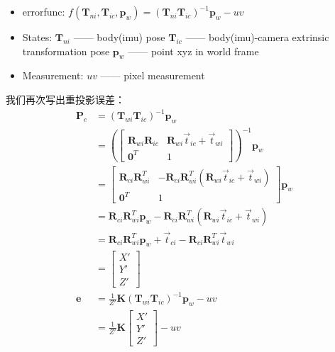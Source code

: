 \documentclass{article}
\begin{document}
\begin{itemize}
	\item errorfunc: $f(\boldsymbol{T}_{ni},\boldsymbol{T}_{ic}, \boldsymbol{p}_{w}) = 
	      (\boldsymbol{T}_{ni}\boldsymbol{T}_{ic})^{-1}\boldsymbol{p}_{w} - uv$
	\item States:   
	      \subitem $\boldsymbol{T}_{ni}$ —— body(imu) pose
	      \subitem $\boldsymbol{T}_{ic}$ —— body(imu)-camera extrinsic transformation pose
	      \subitem $\boldsymbol{p}_{w}$ —— point xyz in world frame
	\item Measurement:  $uv$ —— pixel measurement
\end{itemize}
我们再次写出重投影误差：
\begin{equation}
	\begin{aligned}
		\boldsymbol{P}_c                         & =(\boldsymbol{T}_{wi}\boldsymbol{T}_{ic})^{-1}\boldsymbol{p}_w                                 \\&=
		\left(
		\left[
		\begin{matrix}
		\boldsymbol{R}_{wi}\boldsymbol{R}_{ic}   & \boldsymbol{R}_{wi}\vec{t}_{ic}+\vec{t}_{wi}                                                   \\
		\boldsymbol{0}^T                         & 1                                                                                              
		\end{matrix}
		\right]
		\right)^{-1}\boldsymbol{p}_w \\&=                              
		\left[
		\begin{matrix}
		\boldsymbol{R}_{ci}\boldsymbol{R}_{wi}^T & -\boldsymbol{R}_{ci}\boldsymbol{R}_{wi}^T(\boldsymbol{R}_{wi}\vec{t}_{ic}+\vec{t}_{wi})        \\
		\boldsymbol{0}^T                         & 1                                                                                              
		\end{matrix}
		\right]\boldsymbol{p}_w \\&=
		\boldsymbol{R}_{ci}\boldsymbol{R}_{wi}^T\boldsymbol{p}_w  -\boldsymbol{R}_{ci}\boldsymbol{R}_{wi}^T(\boldsymbol{R}_{wi}\vec{t}_{ic}+\vec{t}_{wi}) \\&=
		\boldsymbol{R}_{ci}\boldsymbol{R}_{wi}^T\boldsymbol{p}_w  +\vec{t}_{ci}-\boldsymbol{R}_{ci}\boldsymbol{R}_{wi}^T\vec{t}_{wi} \\&=
		\left[
		\begin{matrix}
		X'\\
		Y'\\                                         
		Z' 
		\end{matrix}
		\right] \\
		\boldsymbol {e}                          & =\frac{1}{Z'}\boldsymbol{K} (\boldsymbol{T}_{wi}\boldsymbol{T}_{ic})^{-1}\boldsymbol{p}_w  -uv \\&=
		\frac{1}{Z'}\boldsymbol{K} 
		\left[
		\begin{matrix}
		X'\\
		Y'\\                                         
		Z'
		\end{matrix}
		\right]-uv
	\end{aligned}
\end{equation}
\end{document}
